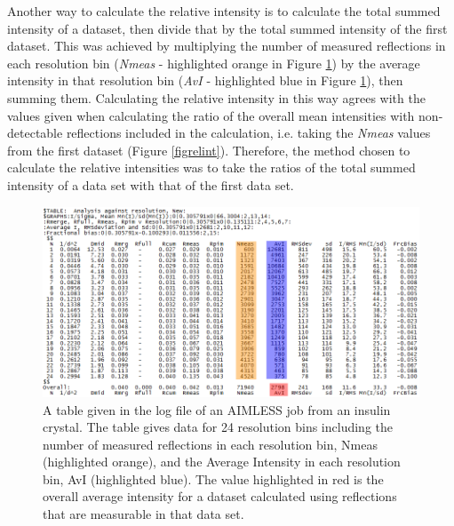 Another way to calculate the relative intensity is to calculate the total summed intensity of a dataset, then divide that by the total summed intensity of the first dataset.
This was achieved by multiplying the number of measured reflections in each resolution bin (\textit{Nmeas} - highlighted orange in Figure \ref{fig: AIMLESS log file}) by the average intensity in that resolution bin (\textit{AvI} - highlighted blue in Figure \ref{fig: AIMLESS log file}), then summing them.
Calculating the relative intensity in this way agrees with the values given when calculating the ratio of the overall mean intensities with non-detectable reflections included in the calculation, i.e. taking the \textit{Nmeas} values from the first dataset (Figure \ref{figrelint}).
Therefore, the method chosen to calculate the relative intensities was to take the ratios of the total summed intensity of a data set with that of the first data set.
\begin{figure}
  \centering
    \includegraphics[width=1\textwidth]{figures/dwd/aimlesslog.png}
    \caption{A table given in the log file of an AIMLESS job from an insulin crystal. The table gives data for 24 resolution bins including the number of measured reflections in each resolution bin, Nmeas (highlighted orange), and the Average Intensity in each resolution bin, AvI (highlighted blue). The value highlighted in red is the overall average intensity for a dataset calculated using reflections that are measurable in that data set.}
    \label{fig: AIMLESS log file}
\end{figure}

